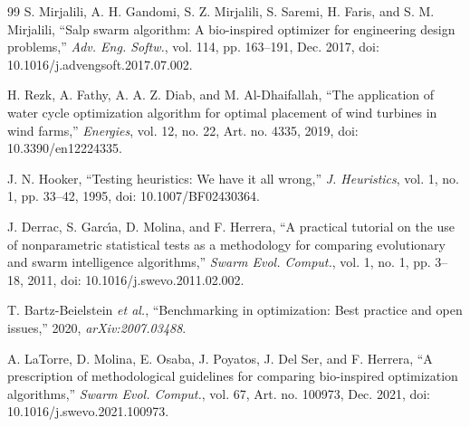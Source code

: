 {\begin{thebibliography}{99}
S. Mirjalili, A. H. Gandomi, S. Z. Mirjalili, S. Saremi, H. Faris, and S. M. Mirjalili, ``Salp swarm algorithm: A bio-inspired optimizer for engineering design problems,'' \textit{Adv. Eng. Softw.}, vol. 114, pp. 163--191, Dec. 2017, doi: 10.1016/j.advengsoft.2017.07.002.

H. Rezk, A. Fathy, A. A. Z. Diab, and M. Al-Dhaifallah, ``The application of water cycle optimization algorithm for optimal placement of wind turbines in wind farms,'' \textit{Energies}, vol. 12, no. 22, Art. no. 4335, 2019, doi: 10.3390/en12224335.

J. N. Hooker, ``Testing heuristics: We have it all wrong,'' \textit{J. Heuristics}, vol. 1, no. 1, pp. 33--42, 1995, doi: 10.1007/BF02430364.

J. Derrac, S. Garc\'{\i}a, D. Molina, and F. Herrera, ``A practical tutorial on the use of nonparametric statistical tests as a methodology for comparing evolutionary and swarm intelligence algorithms,'' \textit{Swarm Evol. Comput.}, vol. 1, no. 1, pp. 3--18, 2011, doi: 10.1016/j.swevo.2011.02.002.

T. Bartz-Beielstein \textit{et al.}, ``Benchmarking in optimization: Best practice and open issues,'' 2020, \textit{arXiv:2007.03488}.

A. LaTorre, D. Molina, E. Osaba, J. Poyatos, J. Del Ser, and F. Herrera, ``A prescription of methodological guidelines for comparing bio-inspired optimization algorithms,'' \textit{Swarm Evol. Comput.}, vol. 67, Art. no. 100973, Dec. 2021, doi: 10.1016/j.swevo.2021.100973.


\end{thebibliography}}
